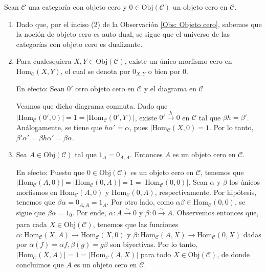 \documentclass[tesis]{subfiles}
\begin{document}
\begin{Obs}\label{Mendoza-1.5.1-Ejer.51}

    Sean $\mathscr{C}$ una categoría con objeto cero y $0\in\text{Obj}(\mathscr{C})$ un objeto cero en $\mathscr{C}$. 
  
    \begin{enumerate}[label=(\arabic*)]

        \item Dado que, por el inciso (2) de la Observación \ref{Obs: Objeto cero}, sabemos que la noción de objeto cero es auto dual, se sigue que el universo de las categorías con objeto cero es dualizante.
    
        \item Para cualesquiera $X,Y\in\text{Obj}(\mathscr{C})$, existe un único morfismo cero en $\text{Hom}_\mathscr{C}(X,Y)$, el cual se denota por $0_{X,Y}$ o bien por $0$.

            En efecto: Sean $0'$ otro objeto cero en $\mathscr{C}$ y el diagrama en $\mathscr{C}$
    \begin{center}
    \end{center}
    Veamos que dicho diagrama conmuta. Dado que $|\text{Hom}_\mathscr{C}(0',0)|=1=|\text{Hom}_\mathscr{C}(0',Y)|$, existe $0'\xrightarrow{h} 0$ en $\mathscr{C}$ tal que $\beta h=\beta'$. Análogamente, se tiene que $h\alpha'=\alpha$, pues $|\text{Hom}_\mathscr{C}(X,0)=1$. Por lo tanto, $\beta'\alpha' = \beta h\alpha' = \beta\alpha$.


        \item Sea $A \in \text{Obj}(\mathscr{C})$ tal que $1_A = 0_{A,A}.$ Entonces $A$ es un objeto cero en $\mathscr{C}$.

            En efecto: Puesto que $0\in\text{Obj}(\mathscr{C})$ es un objeto cero en $\mathscr{C}$, tenemos que $|\text{Hom}_\mathscr{C}(A,0)|=|\text{Hom}_\mathscr{C}(0,A)|=1=|\text{Hom}_\mathscr{C}(0,0)|$. Sean $\alpha$ y $\beta$ los únicos morfismos en $\text{Hom}_\mathscr{C}(A,0)$ y $\text{Hom}_\mathscr{C}(0,A)$, respectivamente. Por hipótesis, tenemos que $\beta\alpha=0_{A,A}=1_A$. Por otro lado, como $\alpha\beta\in\text{Hom}_\mathscr{C}(0,0)$, se sigue que $\beta\alpha=1_0$. Por ende, $\alpha:A\xrightarrow[]{\sim}0$ y $\beta:0\xrightarrow[]{\sim}A$. Observemos entonces que, para cada $X\in\text{Obj}(\mathscr{C})$, tenemos que las funciones $\overline{\alpha}:\text{Hom}_\mathscr{C}(X,A)\to \text{Hom}_\mathscr{C}(X,0)$ y $\overline{\beta}:\text{Hom}_\mathscr{C}(A,X)\to \text{Hom}_\mathscr{C}(0,X)$ dadas por $\overline{\alpha}(f) = \alpha f, \overline{\beta}(g) = g\beta$ son biyectivas. Por lo tanto, $|\text{Hom}_\mathscr{C}(X,A)|=1=|\text{Hom}_\mathscr{C}(A,X)|$ para todo $X\in\text{Obj}(\mathscr{C})$, de donde concluimos que $A$ es un objeto cero en $\mathscr{C}$.


\end{enumerate}
\end{Obs}
\end{document}
